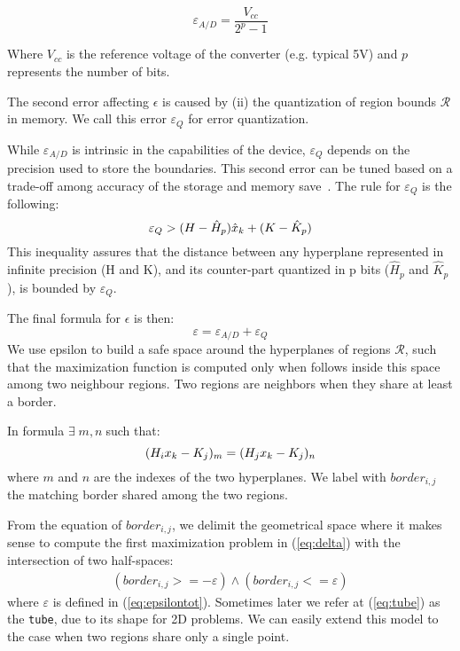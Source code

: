 \begin{equation}\nonumber
\varepsilon_{A/D}=\frac{V_{cc}}{2^{p}-1}
\end{equation}

Where $V_{cc}$ is the reference voltage of the converter (e.g. typical 5V) and $p$ represents the number of bits.

The second error affecting $\epsilon$ is caused by (ii) the quantization of region bounds $\mathcal{R}$ in memory. We call this error $\varepsilon_{Q}$ for error quantization.

While $\varepsilon_{A/D}$ is intrinsic in the capabilities of the device, $\varepsilon_{Q}$ depends on the precision used to store the boundaries. This second error can be tuned based on a trade-off among accuracy of the storage and memory save~\cite{memoryMPC}.
The rule for $\varepsilon_{Q}$ is the following:
\begin{equation}\label{eq:quantizationlines}
\varepsilon_{Q} > (H-\hat{H}_{p})\hat{x}_{k}+(K-\hat{K}_{p})
\end{equation}
This inequality assures that the distance between any hyperplane represented in infinite precision (H and K), and its counter-part quantized in p bits ($\hat{H}_{p}$ and $\hat{K}_{p}$), is bounded by $\varepsilon_{Q}$. 

The final formula for $\epsilon$ is then:
\begin{equation}\label{eq:epsilontot}
\varepsilon=\varepsilon_{A/D}+\varepsilon_{Q}
\end{equation}
We use epsilon to build a safe space around the hyperplanes of regions $\mathcal{R}$, such that the maximization function is computed only when \statevarmath follows inside this space among two neighbour regions.
Two regions are neighbors when they share at least a border.

In formula $\exists\; m,n \;$such that:
\begin{equation}
(H_{i}x_{k}-K_{j})_{m} = (H_{j}x_{k}-K_{j})_{n}
\end{equation}
where $m$ and $n$ are the indexes of the two hyperplanes. We label with $border_{i,j}$ the matching border shared among the two regions.

From the equation of $border_{i,j}$, we delimit the geometrical space where it makes sense to compute the first maximization problem in (\ref{eq:delta}) with the intersection of two half-spaces: 
\begin{equation}\label{eq:tube}
\begin{aligned}
(border_{i,j} >= -\varepsilon) \land
(border_{i,j} <= \varepsilon)
\end{aligned} 
\end{equation}
where $\varepsilon$ is defined in (\ref{eq:epsilontot}). Sometimes later we refer at (\ref{eq:tube}) as the \texttt{tube}, due to its shape for 2D problems. We can easily extend this model to the case when two regions share only a single point.


